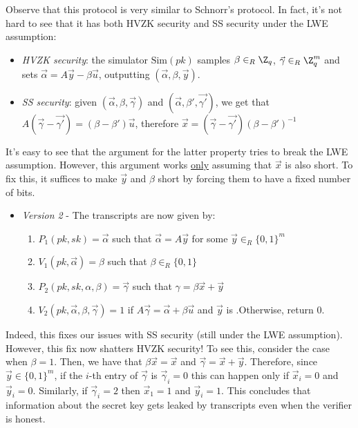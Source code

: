 \documentclass[a4paper, 12pt]{report}
\begin{document}
    Observe that this protocol is very similar to Schnorr's protocol. In fact, it's not hard to see that it has both HVZK security and SS security under the LWE assumption:
    \begin{itemize}
        \item \textit{HVZK security}: the simulator $\mathrm{Sim}(pk)$ samples $\beta \in_R \Z_q$, $\vec \gamma \in_R \Z_q^m$ and sets $\vec \alpha = A \vec y - \beta \vec u$, outputting $(\vec \alpha, \beta, \vec y)$.
        \item \textit{SS security}: given $(\vec \alpha, \beta, \vec \gamma)$ and $(\vec \alpha, \beta', \vec{\gamma '})$, we get that $A(\vec \gamma - \vec{\gamma'}) = (\beta - \beta') \vec u$, therefore $\vec x = (\vec \gamma - \vec{\gamma'})(\beta - \beta')^{-1}$
    \end{itemize}

    It's easy to see that the argument for the latter property tries to break the LWE assumption. However, this argument works \underline{only} assuming that $\vec x$ is also short. To fix this, it suffices to make $\vec y$ and $\beta$ short by forcing them to have a fixed number of bits.
    \begin{itemize}
        \item \textit{Version 2} - The transcripts are now given by:
        \begin{enumerate}
            \item $P_1(pk,sk) = \vec \alpha$ such that $\vec \alpha = A \vec y$ for some $\vec y \in_R \{0,1\}^m$
            \item $V_1(pk, \vec \alpha) = \beta$ such that $\beta \in_R \{0,1\}$
            \item $P_2(pk,sk,\alpha, \beta) = \vec\gamma$ such that $\gamma = \beta \vec x + \vec y$
            \item $V_2(pk, \vec\alpha, \beta, \vec\gamma) = 1$ if $A \vec \gamma = \vec \alpha + \beta \vec u$ and $\vec y$ is .Otherwise, return $0$.
        \end{enumerate}
    \end{itemize}

    Indeed, this fixes our issues with SS security (still under the LWE assumption). However, this fix now shatters HVZK security! To see this, consider the case when $\beta = 1$. Then, we have that $\beta \vec x = \vec x$ and $\vec \gamma = \vec x + \vec y$. Therefore, since $\vec y \in \{0,1\}^m$, if the $i$-th entry of $\vec \gamma$ is $\vec \gamma_i = 0$ this can happen only if $\vec x_i = 0$ and $\vec y_i = 0$. Similarly, if $\vec \gamma_i = 2$ then $\vec x_1 = 1$ and $\vec y_i = 1$. This concludes that information about the secret key gets leaked by transcripts even when the verifier is honest.
\end{document}
